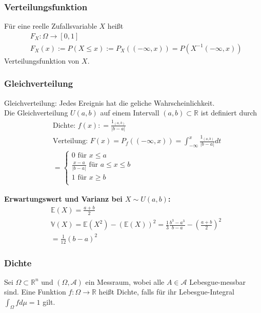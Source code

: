 \documentclass[a4paper]{article}
\begin{document}
\subsubsection{Verteilungsfunktion}
Für eine reelle Zufallsvariable $X$ heißt 
\begin{align*} 
& F_X : \Omega \to [0,1] \\
& F_X (x) := P (X \leq x) := P_X (( -\infty, x )) = P(X^{-1} (-\infty, x))
\end{align*}
Verteilungsfunktion von $X$.

\subsubsection{Gleichverteilung}
Gleichverteilung: Jedes Ereignis hat die geliche Wahrscheinlichkeit. \\
Die Gleichverteilung $U{(a,b)}$ auf einem Intervall $(a,b) \subset \mathbb{R}$ ist definiert durch
\begin{align*}
& \text{Dichte: } f (x) : = \frac{1_{(a,b)}}{|b-a| } \\
& \text{Verteilung: } F (x) =  P_f( (-\infty, x))  =  \int_{-\infty}^{x} \frac{1_{(a,b)}}{|b-a|} dt\\\
& = \begin {cases} 0 \text{ für } x \leq a \\   \frac{x-a}{|b-a|} \text{ für } a \leq x \leq b \\ 1 \text{ für }  x \geq b \\  \end{cases}
\end{align*}

\textbf{Erwartungswert und Varianz bei $X \sim U(a,b)$:}
\begin{align*}
& \mathbb{E}(X) = \frac{a+b}2 \\
& \mathbb{V}(X) = \mathbb{E}(X^2) - \left({\mathbb{E}(X)} \right)^2  = \frac{1}{3}\frac{b^3  - a^3}{b - a} - \left( {\frac{a + b}{2}} \right)^2 \\
    &= \frac{1}{12}(b - a)^2
\end{align*}

\subsubsection{Dichte}
Sei $\Omega \subset \mathbb{R}^n$ und $(\Omega, \mathcal{A})$ ein Messraum, wobei alle $A \in \mathcal{A}$ Lebesgue-messbar sind.
 Eine Funktion $f: \Omega \to \mathbb{R}$ heißt Dichte, falls für ihr Lebesgue-Integral $\int_{\Omega} f d \mu = 1$ gilt.
\end{document}
